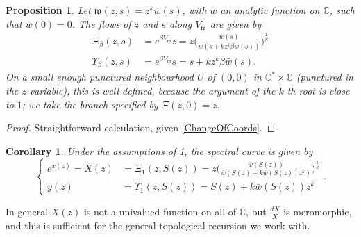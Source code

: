 \documentclass[10pt,a4paper,oneside,no-math,reqno]{amsart}%
\theoremstyle{plain}
\newtheorem{proposition}[theorem]{Proposition}
\newtheorem{corollary}[theorem]{Corollary}
\theoremstyle{definition}
\theoremstyle{remark}
\numberwithin{equation}{section}
\newcommand{\mb}[1]{\mathbb{#1}}
\newcommand{\mf}[1]{\mathfrak{#1}}
\newcommand{\1}{\mathds{1}}
\newcommand{\C}{\mb{C}}
\newcommand{\<}{\langle}
\renewcommand{\>}{\rangle}
\begin{document}
\begin{proposition}\label{Symplectomorphism}
	Let $ \mf{w}(z,s) = z^k \bar{w}(s)$, with $ \bar{w} $ an analytic function on $ \C$, such that $ \bar{w} (0) = 0$. The flows of $ z$ and $ s$ along $ V_\mf{w}$ are given by
	\begin{align}
		\Xi_\beta (z,s)
		&= e^{\beta V_\mf{w}} z 
		=
		z \Big( \frac{\bar{w}(s)}{\bar{w}(s+ k z^k \beta \bar{w}(s))}\Big)^{\frac{1}{k}}
		\\
		\Upsilon_\beta (z,s)
		&=
		e^{\beta V_\mf{w}} s
		=
		s + k z^k \beta \bar{w} (s) .
	\end{align}
	On a small enough punctured neighbourhood $U$ of $ (0,0) $ in $ \C^* \times \C$ (punctured in the $ z$-variable), this is well-defined, because the argument of the $k$-th root is close to $ 1$; we take the branch specified by $ \Xi (z,0) = z$.\par
\end{proposition}

\begin{proof}
	Straightforward calculation, given \cref{ChangeOfCoords}.
\end{proof}


\begin{corollary}\label{SpectralCurveShape}
	Under the assumptions of \cref{Symplectomorphism}, the spectral curve is given by
	\begin{equation} \label{SpectralCurveParam}
		\begin{cases}
			e^{x(z)}
            =
            X(z)
			&=
			\Xi_1 (z, S(z))
			=
			z \Big( \frac{\bar{w}(S(z))}{\bar{w}(S(z)+ k \bar{w}(S(z))z^k)}\Big)^{\frac{1}{k}}
			\\
			y (z)
			&=
			\Upsilon_1 (z, S(z))
			=
			S(z) + k \bar{w}(S(z)) z^k
		\end{cases} .
	\end{equation}
\end{corollary}

In general $ X(z)$ is not a univalued function on all of $ \C$, but $ \frac{dX}{X}$ is meromorphic, and this is sufficient for the general topological recursion we work with.


\end{document}
